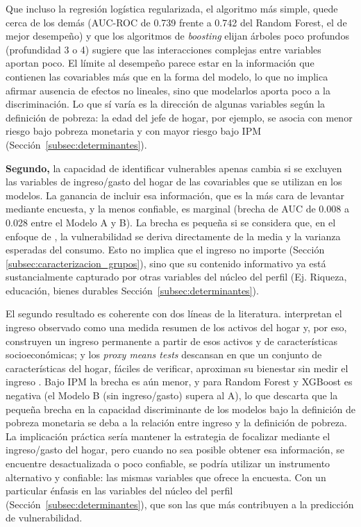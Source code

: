 \documentclass[12pt, letterpaper]{article}
\begin{document}
Que incluso la regresión logística regularizada, el algoritmo más simple,
quede cerca de los demás (AUC-ROC de 0.739 frente a 0.742 del Random Forest, el de mejor desempeño) y que los algoritmos de
\emph{boosting} elijan árboles poco profundos (profundidad 3 o 4) sugiere
que las interacciones complejas entre variables aportan poco. El límite al
desempeño parece estar en la información que contienen las covariables más
que en la forma del modelo, lo que no implica afirmar ausencia de efectos no lineales,
sino que modelarlos aporta poco a la discriminación. Lo que sí varía es la
dirección de algunas variables según la definición de pobreza: la edad del
jefe de hogar, por ejemplo, se asocia con menor riesgo bajo pobreza
monetaria y con mayor riesgo bajo IPM (Sección~\ref{subsec:determinantes}).



\textbf{Segundo,} la capacidad de identificar vulnerables apenas cambia
si se excluyen las variables de ingreso/gasto del hogar de las
covariables que se utilizan en los modelos. La ganancia
de incluir esa información, que es la más cara de levantar mediante encuesta, 
y la menos confiable, es marginal (brecha de AUC de 0.008 a 0.028 entre
el Modelo A y B). La brecha es pequeña si se considera que, en el enfoque
de \textcite{chaudhuri2002}, la vulnerabilidad se deriva directamente de
la media y la varianza esperadas del consumo. Esto no
implica que el ingreso no importe (Sección~
\ref{subsec:caracterizacion_grupos}), sino que su contenido informativo
ya está sustancialmente capturado por otras variables del núcleo del
perfil (Ej. Riqueza, educación, bienes durables Sección~\ref{subsec:determinantes}).

El segundo resultado es coherente con dos líneas de la literatura.
\textcite{lopezCalva2014} interpretan el ingreso observado como una medida
resumen de los activos del hogar y, por eso, construyen un ingreso
permanente a partir de esos activos y de características socioeconómicas;
y los \emph{proxy means tests} descansan en que un conjunto de
características del hogar, fáciles de verificar, aproximan su bienestar sin
medir el ingreso \parencite{mcbride2018}.
Bajo IPM la brecha es aún menor, y para Random Forest y XGBoost es negativa 
(el Modelo B (sin ingreso/gasto) supera al
A), lo que descarta que la pequeña brecha en la capacidad discriminante 
de los modelos bajo la definición de pobreza monetaria se deba a la
relación entre ingreso y la definición de pobreza. La
implicación práctica sería mantener la estrategia de focalizar mediante 
el ingreso/gasto del hogar, pero cuando no sea posible obtener esa información,
se encuentre desactualizada o poco confiable, se podría utilizar 
un instrumento alternativo y confiable: las mismas variables que 
ofrece la encuesta. Con un particular énfasis en las variables del 
núcleo del perfil (Sección~\ref{subsec:determinantes}), que son las que más 
contribuyen a la predicción de vulnerabilidad.
\end{document}
